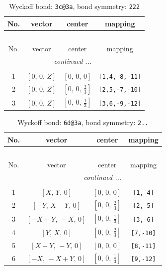 \documentclass[fleqn,8pt]{jsarticle}
\begin{document}
\renewcommand{\arraystretch}{1.2}
\begin{longtable}{cccc}
\caption{Wyckoff bond: {\tt 3c@3a}, bond symmetry: {\tt 222}}
 \\
 \hline \hline
No. & vector & center & mapping \\ \hline \endfirsthead

\multicolumn{3}{l}{\tablename\ \thetable{}} \\
 \hline \hline
No. & vector & center & mapping \\ \hline \endhead

 \hline \hline
\multicolumn{3}{r}{\footnotesize\it continued ...} \\ \endfoot

 \hline \hline
\multicolumn{3}{r}{} \\ \endlastfoot

1 & $\left[ 0,\, 0,\, Z \right]$ & $\left[ 0,\, 0,\, 0 \right]$ & {\tt [1,4,-8,-11]} \\ \hline
2 & $\left[ 0,\, 0,\, Z \right]$ & $\left[ 0,\, 0,\, \frac{2}{3} \right]$ & {\tt [2,5,-7,-10]} \\ \hline
3 & $\left[ 0,\, 0,\, Z \right]$ & $\left[ 0,\, 0,\, \frac{1}{3} \right]$ & {\tt [3,6,-9,-12]} \\
\end{longtable}
\renewcommand{\arraystretch}{1.2}
\begin{longtable}{cccc}
\caption{Wyckoff bond: {\tt 6d@3a}, bond symmetry: {\tt 2..}}
 \\
 \hline \hline
No. & vector & center & mapping \\ \hline \endfirsthead

\multicolumn{3}{l}{\tablename\ \thetable{}} \\
 \hline \hline
No. & vector & center & mapping \\ \hline \endhead

 \hline \hline
\multicolumn{3}{r}{\footnotesize\it continued ...} \\ \endfoot

 \hline \hline
\multicolumn{3}{r}{} \\ \endlastfoot

1 & $\left[ X,\, Y,\, 0 \right]$ & $\left[ 0,\, 0,\, 0 \right]$ & {\tt [1,-4]} \\ \hline
2 & $\left[ - Y,\, X - Y,\, 0 \right]$ & $\left[ 0,\, 0,\, \frac{2}{3} \right]$ & {\tt [2,-5]} \\ \hline
3 & $\left[ - X + Y,\, - X,\, 0 \right]$ & $\left[ 0,\, 0,\, \frac{1}{3} \right]$ & {\tt [3,-6]} \\ \hline
4 & $\left[ Y,\, X,\, 0 \right]$ & $\left[ 0,\, 0,\, \frac{2}{3} \right]$ & {\tt [7,-10]} \\ \hline
5 & $\left[ X - Y,\, - Y,\, 0 \right]$ & $\left[ 0,\, 0,\, 0 \right]$ & {\tt [8,-11]} \\ \hline
6 & $\left[ - X,\, - X + Y,\, 0 \right]$ & $\left[ 0,\, 0,\, \frac{1}{3} \right]$ & {\tt [9,-12]} \\
\end{longtable}
\end{document}
